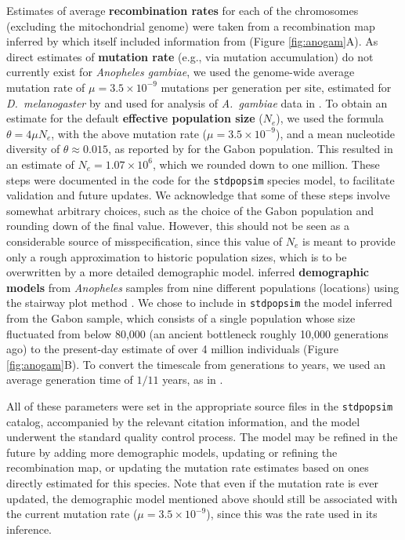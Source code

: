 \documentclass[hidelinks]{article}
\newcommand{\stdpopsim}{\texttt{stdpopsim}\xspace}
\begin{document}
Estimates of average \textbf{recombination rates} for each of the chromosomes (excluding the mitochondrial genome)
were taken from a recombination map inferred by \citet{Pombi2006} which itself included information from
\citet{zheng1996integrated} (Figure \ref{fig:anogam}A).
As direct estimates of \textbf{mutation rate} (e.g., via mutation accumulation) do not currently exist for \emph{Anopheles gambiae},
we used the genome-wide average mutation rate of $\mu=3.5 \times 10^{-9}$ mutations per generation per site,
estimated for \textit{D.~melanogaster} by \cite{Keightley2009}
and used for analysis of \textit{A.~gambiae} data in \citet{Miles2017}.
To obtain an estimate for the default \textbf{effective population size} ($N_e$),
we used the formula $\theta=4\mu N_e$,
with the above mutation rate ($\mu=3.5 \times 10^{-9}$),
and a mean nucleotide diversity of $\theta\approx 0.015$,
as reported by \citet{Miles2017} for the Gabon population.
This resulted in an estimate of $N_e=1.07\times 10^{6}$,
which we rounded down to one million. 
These steps were documented in the code for the \stdpopsim species model,
to facilitate validation and future updates.
We acknowledge that some of these steps involve somewhat arbitrary choices,
such as the choice of the Gabon population and rounding down of the final value.
However, this should not be seen as a considerable source of misspecification,
since this value of $N_e$ is meant to provide only a rough approximation to
historic population sizes, which is to be overwritten by a more detailed demographic model.
%
\citet{Miles2017} inferred \textbf{demographic models} from \textit{Anopheles} samples from nine different populations (locations) using the stairway plot method \citep{Liu2015}.
We chose to include in \stdpopsim the model inferred from the Gabon sample, 
which consists of a single population whose size fluctuated from below 80,000
(an ancient bottleneck roughly 10,000 generations ago) to the present-day estimate of over 4 million individuals (Figure \ref{fig:anogam}B).
To convert the timescale from generations to years,
we used an average generation time of $1/11$ years,
as in \cite{Miles2017}.


All of these parameters were set in the appropriate source files in the \stdpopsim catalog,
accompanied by the relevant citation information,
and the model underwent the standard quality control process.
The model may be refined in the future by adding more demographic models,
updating or refining the recombination map,
or updating the mutation rate estimates based on ones directly estimated for this species.
Note that even if the mutation rate is ever updated,
the demographic model mentioned above should still be associated with the current
mutation rate ($\mu=3.5 \times 10^{-9}$),
since this was the rate used in its inference.
\end{document}
